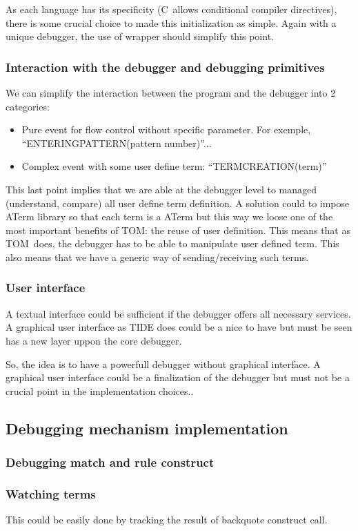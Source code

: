 \documentclass[a4paper]{article}
\newcommand{\TOM}{\textsf{TOM}}
\newcommand{\C}{\textsf{C}}
\begin{document}
As each language has its specificity (\C\ allows conditional compiler
directives), there is some crucial choice to made this initialization
as simple.
Again with a unique debugger, the use of wrapper should simplify this point.

\subsubsection{Interaction with the debugger and debugging primitives}
We can simplify the interaction between the program and the debugger
into 2 categories:
\begin{itemize}
\item Pure event for flow control without specific parameter. For
  exemple, ``ENTERINGPATTERN(pattern number)''...
\item Complex event with some user define term: ``TERMCREATION(term)''
\end{itemize}
This last point implies that we are able at the debugger level to
managed (understand, compare) all user define term definition. A
solution could to impose ATerm library so that each term is a ATerm
but this way we loose one of the most important benefits of \TOM: the
reuse of user definition. This means that as \TOM\ does, the debugger
has to be able to manipulate user defined term. This also means that
we have a generic way of sending/receiving such terms.

\subsubsection{User interface}
A textual interface could be sufficient if the debugger offers all
necessary services. A graphical user interface as TIDE does could be a
nice to have but must be seen has a new layer uppon the core debugger.

So, the idea is to have a powerfull debugger without graphical
interface. A graphical user interface could be a finalization of the
debugger but must not be a crucial point in the implementation choices..

\subsection{Debugging mechanism implementation}

\subsubsection{Debugging match and rule construct}

\subsubsection{Watching terms}
This could be easily done by tracking the result of backquote construct call.
\end{document}
